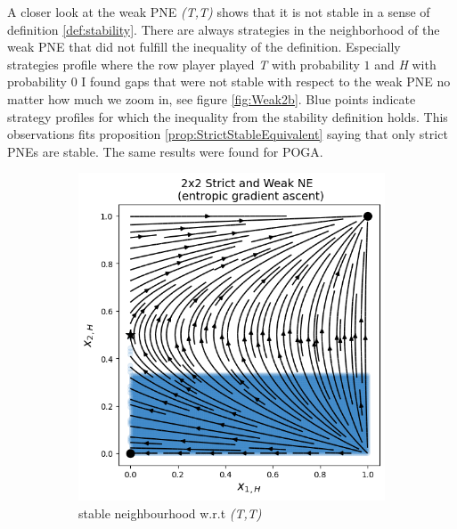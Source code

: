 A closer look at the weak PNE \textit{(T,T)} shows that it is not stable in a sense of definition \ref{def:stability}. There are always strategies in the neighborhood of the weak PNE that did not fulfill the inequality of the definition. Especially strategies profile where the row player played \textit{T} with probability $1$ and \textit{H} with probability $0$ I found gaps that were not stable with respect to the weak PNE no matter how much we zoom in, see figure \ref{fig:Weak2b}. Blue points indicate strategy profiles for which the inequality from the stability definition holds. This observations fits proposition \ref{prop:StrictStableEquivalent} saying that only strict PNEs are stable. The same results were found for POGA. \\

\begin{figure}[H]
\captionsetup{justification=centering}
\centering
\begin{subfigure}{.48\textwidth}
    \centering
    \includegraphics[width=\textwidth]{logos/Weak3.png}
    \caption{stable neighbourhood w.r.t \textit{(T,T)}}
    \label{fig:Weak2a}
\end{subfigure}%
\begin{subfigure}{.52\textwidth}
    \centering

\end{subfigure}
\end{figure}

